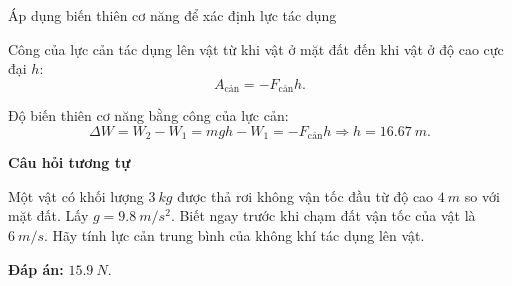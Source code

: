 \begin{dang}{Áp dụng biến thiên cơ năng  để xác định lực tác dụng }
{		Công của lực cản tác dụng lên vật từ khi vật ở mặt đất đến khi vật ở độ cao cực đại $h$:
		$$A_\text{cản} = -F_\text{cản} h.$$
		
		Độ biến thiên cơ năng bằng công của lực cản:
		$$\Delta W = W_2 - W_1 = mgh - W_1 = -F_\text{cản} h \Rightarrow h= \SI{16.67}{m}.$$
		
		\begin{center}
			\textbf{Câu hỏi tương tự}
		\end{center}
		
		Một vật có khối lượng $\SI{3}{kg}$ được thả rơi không vận tốc đầu từ độ cao $\SI{4}{m}$ so với mặt đất. Lấy $g=\SI{9.8}{m/s^2}$. Biết ngay trước khi chạm đất vận tốc của vật là $\SI{6}{m/s}$. Hãy tính lực cản trung bình của không khí tác dụng lên vật.
		
		\textbf{Đáp án:} $\SI{15.9}{N}$.
	}
\end{dang}
